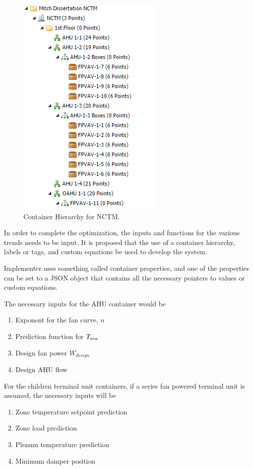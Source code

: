 \begin{figure}
\centering
\includegraphics{Images/ContainerHierarchy.PNG}
\caption{Container Hierarchy for NCTM.}
\label{fig:ContainerHierarchy}
\end{figure}

In order to complete the optimization, the inputs and functions for the
various trends needs to be input. It is proposed that the use of a
container hierarchy, labels or tags, and custom equations be used to
develop the system.

Implementer uses something called container properties, and one of the
properties can be set to a JSON object that contains all the necessary
pointers to values or custom equations.

The necessary inputs for the AHU container would be 
\begin{enumerate}
    \item Exponent for the fan curve, \(n\)
    \item Prediction function for \(T_{ma}{}\) 
    \item Design fan power \(\dot{W}_{design}\)
    \item Design AHU flow 
\end{enumerate}
For the children terminal unit containers, if a series fan powered
terminal unit is assumed, the necessary inputs will be
\begin{enumerate}
    \item Zone temperature setpoint prediction
    \item Zone load prediction
    \item Plenum temperature prediction
    \item Minimum damper position
\end{enumerate}

